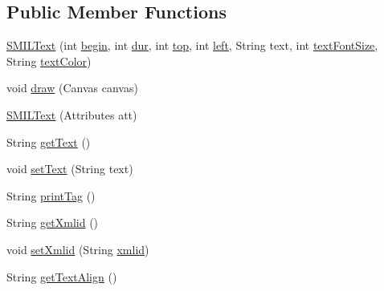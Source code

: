 \subsection*{Public Member Functions}
\begin{DoxyCompactItemize}
\item 
\hyperlink{classcsc440_1_1nuf_1_1components_1_1_s_m_i_l_text_a138b548477e92aaf86cb307966139c36}{S\-M\-I\-L\-Text} (int \hyperlink{classcsc440_1_1nuf_1_1components_1_1_abstract_s_m_i_l_object_a3279cee1dba4afdcc793a276d05bb7a1}{begin}, int \hyperlink{classcsc440_1_1nuf_1_1components_1_1_abstract_s_m_i_l_object_a8e4a82668aeae5fb178466d5579cd1e9}{dur}, int \hyperlink{classcsc440_1_1nuf_1_1components_1_1_s_m_i_l_text_a66c25a146ade90fb42a6f63a6198ddd7}{top}, int \hyperlink{classcsc440_1_1nuf_1_1components_1_1_s_m_i_l_text_a8d51549a85efeaf18a85837154449da9}{left}, String text, int \hyperlink{classcsc440_1_1nuf_1_1components_1_1_s_m_i_l_text_a1cc323cc7543c674087e2b600a04000d}{text\-Font\-Size}, String \hyperlink{classcsc440_1_1nuf_1_1components_1_1_s_m_i_l_text_a014665b36e792464e32589735dc9d25b}{text\-Color})
\item 
void \hyperlink{classcsc440_1_1nuf_1_1components_1_1_s_m_i_l_text_a03f6fe93c172a493c65862d99e877e05}{draw} (Canvas canvas)
\item 
\hyperlink{classcsc440_1_1nuf_1_1components_1_1_s_m_i_l_text_aedc70b1dd23a53237160fede4b0e4c2d}{S\-M\-I\-L\-Text} (Attributes att)
\item 
String \hyperlink{classcsc440_1_1nuf_1_1components_1_1_s_m_i_l_text_ad6895c2e7b6cd50f3e0152e5a5c7158a}{get\-Text} ()
\item 
void \hyperlink{classcsc440_1_1nuf_1_1components_1_1_s_m_i_l_text_abe863bf12d1e4e0c949b2903c601f34a}{set\-Text} (String text)
\item 
String \hyperlink{classcsc440_1_1nuf_1_1components_1_1_s_m_i_l_text_a08a8a1dff18366c7a4bf62c8af16cb48}{print\-Tag} ()
\item 
String \hyperlink{classcsc440_1_1nuf_1_1components_1_1_s_m_i_l_text_a0a1cb04aafb6b08141bb4c9084ccfe40}{get\-Xmlid} ()
\item 
void \hyperlink{classcsc440_1_1nuf_1_1components_1_1_s_m_i_l_text_a67d1b03d069b99855cf5ed4ad347ba02}{set\-Xmlid} (String \hyperlink{classcsc440_1_1nuf_1_1components_1_1_s_m_i_l_text_a78a68077966f0348c75d1d504db42828}{xmlid})
\item 
String \hyperlink{classcsc440_1_1nuf_1_1components_1_1_s_m_i_l_text_af5b7b6f8d8094f98923c8320d013d0d9}{get\-Text\-Align} ()
\item 

\end{DoxyCompactItemize}
